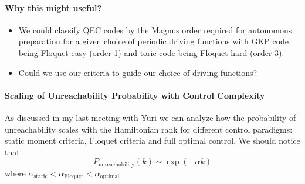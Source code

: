 \documentclass[ a4paper, 
                amsfonts, 
                amssymb, 
                amsmath, 
                reprint, 
                showkeys, 
                nofootinbib,
                superscriptaddress, 
                onecolumn, 
                notitlepage,
                aps,
                pra,
                longbibliography]{revtex4-1}
\newcommand{\tom}[1]{\textcolor{purple}{#1}}
\theoremstyle{definition}
\begin{document}
\paragraph{Why this might useful?}
\begin{itemize}
    \item We could classify QEC codes by the Magnus order required for autonomous preparation for a given choice of periodic driving functions with GKP code being Floquet-easy (order 1) and toric code being Floquet-hard (order 3). 
    \item Could we use our criteria to guide our choice of driving functions?
\end{itemize}






\paragraph{Scaling of Unreachability Probability with Control Complexity}

As discussed in my last meeting with Yuri we can analyze how the probability of unreachability scales with the Hamiltonian rank for different control paradigms: static moment criteria, Floquet criteria and full optimal control. We should notice that 
\begin{equation}
    P_{\text{unreachability}}(k) \sim \exp(-\alpha k)
\end{equation}
where $\alpha_{\text{static}} < \alpha_{\text{Floquet}} < \alpha_{\text{optimal}}$








\end{document}
